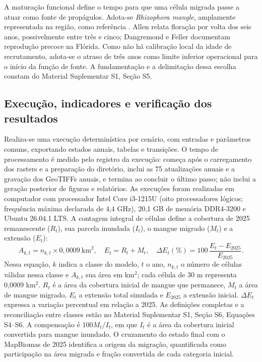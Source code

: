 \documentclass[12pt,a4paper]{article}
\begin{document}
A maturação funcional define o tempo para que uma célula migrada passe a atuar como fonte de propágulos. Adota-se \textit{Rhizophora mangle}, amplamente representada na região, como referência \citep{menezes2008}. Allen \citeyearpar{allen2002} relata floração por volta dos seis anos, possivelmente entre três e cinco; Dangremond e Feller \citeyearpar{dangremond2016} documentam reprodução precoce na Flórida. Como não há calibração local da idade de recrutamento, adota-se o atraso de três anos como limite inferior operacional para o início da função de fonte. A fundamentação e a delimitação dessa escolha constam do Material Suplementar S1, Seção S5.

\subsection{Execução, indicadores e verificação dos resultados}
Realiza-se uma execução determinística por cenário, com entradas e parâmetros comuns, exportando estados anuais, tabelas e transições. O tempo de processamento é medido pelo registro da execução: começa após o carregamento dos rasters e a preparação do diretório, inclui as 75 atualizações anuais e a gravação dos GeoTIFFs anuais, e termina ao concluir o último passo; não inclui a geração posterior de figuras e relatórios. As execuções foram realizadas em computador com processador Intel Core i3-1215U (oito processadores lógicos; frequência máxima declarada de 4,4 GHz), 20,1 GB de memória DDR4-3200 e Ubuntu 26.04.1 LTS. A contagem integral de células define a cobertura de 2025 remanescente ($R_t$), sua parcela inundada ($I_t$), o mangue migrado ($M_t$) e a extensão ($E_t$):
\begin{equation}
A_{k,t}=n_{k,t}\times0,0009\ \mathrm{km}^{2},\quad
E_t=R_t+M_t,\quad
\Delta E_t(\%)=100\,\frac{E_t-E_{2025}}{E_{2025}}.
\label{eq:areas}
\end{equation}
Nessa equação, $k$ indica a classe do modelo, $t$ o ano, $n_{k,t}$ o número de células válidas nessa classe e $A_{k,t}$ sua área em km$^2$; cada célula de 30 m representa 0,0009 km$^2$. $R_t$ é a área da cobertura inicial de mangue que permanece, $M_t$ a área de mangue migrado, $E_t$ a extensão total simulada e $E_{2025}$ a extensão inicial. $\Delta E_t$ expressa a variação percentual em relação a 2025. As definições completas e a reconciliação entre classes estão no Material Suplementar S1, Seção S6, Equações S4--S6. A compensação é $100M_t/I_t$, em que $I_t$ é a área da cobertura inicial convertida para mangue inundado. O cruzamento do estado final com o MapBiomas de 2025 identifica a origem da migração, quantificada como participação na área migrada e fração convertida de cada categoria inicial.
\end{document}
